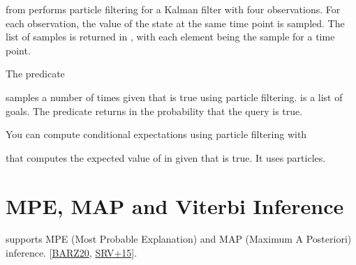 \documentclass[letterpaper,10pt,english]{sphinxmanual}
\begin{document}
\sphinxAtStartPar
from  performs particle filtering for a Kalman filter with four observations.
For each observation, the value of the state at the same time point is sampled.
The list of samples is returned in \sphinxcode{\sphinxupquote{{[}F1,F2,F3,F4{]}}}, with each element being the sample for a time point.

\sphinxAtStartPar
The predicate

\begin{sphinxVerbatim}[commandchars=\\\{\}]
  
\end{sphinxVerbatim}

\sphinxAtStartPar
samples  a number of  times given that  is true using particle filtering.  is a list of goals.
The predicate returns in  the probability that the query is true.

\sphinxAtStartPar
You can compute conditional expectations using particle filtering with

\begin{sphinxVerbatim}[commandchars=\\\{\}]
  
\end{sphinxVerbatim}

\sphinxAtStartPar
that computes the expected value of  in  given that  is true.
It uses  particles.


\section{MPE, MAP and Viterbi Inference}
\label{\detokenize{index:mpe-map-and-viterbi-inference}}
\sphinxAtStartPar
{} supports MPE (Most Probable Explanation) and MAP (Maximum A Posteriori) inference. {[}\hyperlink{cite.index:id44}{BARZ20}, \hyperlink{cite.index:id43}{SRV+15}{]}.
\end{document}
